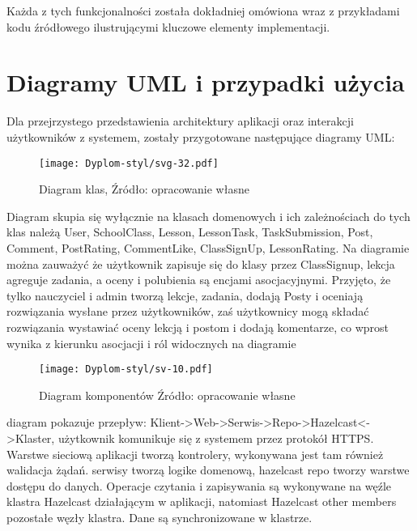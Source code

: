 Każda z tych funkcjonalności została dokładniej omówiona wraz z przykładami kodu źródłowego ilustrującymi kluczowe elementy implementacji.

\section{Diagramy UML i przypadki użycia}

Dla przejrzystego przedstawienia architektury aplikacji oraz interakcji użytkowników z systemem, zostały przygotowane następujące diagramy UML:

\begin{figure}[H] %
    \centering %
    \texttt{[image: Dyplom-styl/svg-32.pdf]} %
    \caption{Diagram klas, Źródło: opracowanie własne}
    \label{fig:system_klas_zadan}
\end{figure}
Diagram skupia się wyłącznie na klasach domenowych i ich zależnościach do tych klas należą User, SchoolClass, Lesson, LessonTask, TaskSubmission, Post, Comment, PostRating, CommentLike, ClassSignUp, LessonRating. Na diagramie można zauważyć że użytkownik zapisuje się do klasy przez ClassSignup, lekcja agreguje zadania, a oceny i polubienia są encjami asocjacyjnymi. Przyjęto, że tylko nauczyciel i admin tworzą lekcje, zadania, dodają Posty i oceniają rozwiązania wysłane przez użytkowników, zaś użytkownicy mogą składać rozwiązania wystawiać oceny lekcją i postom i dodają komentarze, co wprost wynika z kierunku asocjacji i ról widocznych na diagramie
\begin{figure}[H]
  \centering
  \texttt{[image: Dyplom-styl/sv-10.pdf]}
  \caption{Diagram komponentów Źródło: opracowanie własne}
  \label{fig:system_klas_zadan}
\end{figure}
diagram pokazuje przepływ: Klient->Web->Serwis->Repo->Hazelcast<->Klaster, użytkownik komunikuje się z systemem przez protokół HTTPS. Warstwe sieciową aplikacji tworzą kontrolery, wykonywana jest tam również walidacja żądań. serwisy tworzą logike domenową, hazelcast repo tworzy warstwe dostępu do danych. Operacje czytania i zapisywania są wykonywane na węźle klastra Hazelcast działającym w aplikacji, natomiast Hazelcast other members pozostałe węzły klastra. Dane są synchronizowane w klastrze.
